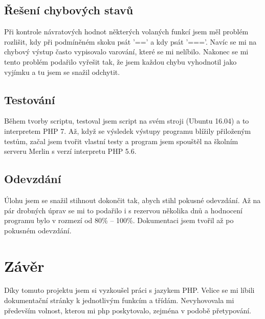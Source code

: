 \documentclass[a4paper, 10pt]{article}
\begin{document}
        \subsection{Řešení chybových stavů}
            Při kontrole návratových hodnot některých volaných funkcí jsem měl
            problém rozlišit, kdy při podmíněném skoku psát '==' a kdy psát '==='.
            Navíc se mi na chybový výstup často vypisovalo varování, které se mi
            nelíbilo. Nakonec se mi tento problém podařilo vyřešit tak, že jsem
            každou chybu vyhodnotil jako vyjímku a tu jsem se snažil odchytit.
        \subsection{Testování}
            Během tvorby scriptu, testoval jsem script na svém stroji (Ubuntu 16.04)
            a to interpretem PHP 7. Až, když se výsledek výstupy programu blížily
            přiloženým testům, začal jsem tvořit vlastní testy a program jsem spouštěl
            na školním serveru Merlin s verzí interpretu PHP 5.6.
        \subsection{Odevzdání}
            Úlohu jsem se snažil stihnout dokončit tak, abych stihl pokusné odevzdání.
            Až na pár drobných úprav se mi to podařilo i s rezervou několika dnů
            a hodnocení programu bylo v rozmezí od 80\% -- 100\%. Dokumentaci jsem
            tvořil až po pokusném odevzdání.
    \section{Závěr}
        Díky tomuto projektu jsem si vyzkoušel práci s jazykem PHP. Velice se mi
        líbili dokumentační stránky k jednotlivým funkcím a třídám. Nevyhovovala
        mi především volnost, kterou mi php poskytovalo, zejména v podobě
        přetypování.
\end{document}
